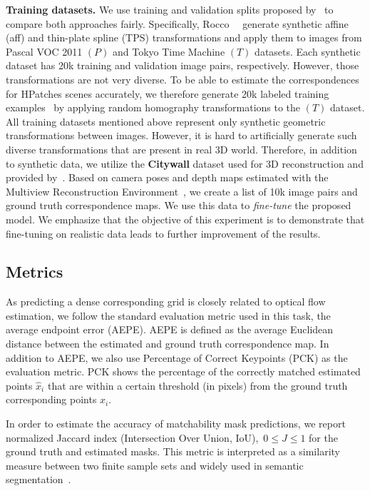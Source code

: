 \documentclass[10pt,twocolumn,letterpaper]{article}
\begin{document}
\noindent\textbf{Training datasets.} We use training and validation splits proposed by~\cite{Rocco17} to compare both approaches fairly. Specifically, Rocco~\etal ~\cite{Rocco17} generate synthetic affine (aff) and thin-plate spline (TPS) transformations and apply them to images from Pascal VOC 2011 $(P)$ and Tokyo Time Machine $(T)$ datasets. Each synthetic dataset has 20k training and validation image pairs, respectively. However, those transformations are not very diverse. 
To be able to estimate the correspondences for HPatches scenes accurately, we therefore generate 20k labeled training examples~\cite{DeepHomography} by applying random homography transformations to the $(T)$ dataset. All training datasets mentioned above represent only synthetic geometric transformations between images. However, it is hard to artificially generate such diverse transformations that are present in real 3D world. Therefore, in addition to synthetic data, we utilize the \textbf{Citywall} dataset used for 3D reconstruction and provided by~\cite{MVE}. Based on camera poses and depth maps estimated with the Multiview Reconstruction Environment~\cite{MVE}, we create a list of 10k image pairs and ground truth correspondence maps. We use this data to \textit{fine-tune} the proposed model. We emphasize that the objective of this experiment is to demonstrate that fine-tuning on realistic data leads to further improvement of the results.

\vspace{-1mm}
\subsection{Metrics}
As predicting a dense corresponding grid is closely related to optical flow estimation, we follow the standard evaluation metric used in this task, \ie the average endpoint error (AEPE). AEPE is  defined as the average Euclidean distance between the estimated and ground truth correspondence map. In addition to AEPE, we also use Percentage of Correct Keypoints (PCK) as the evaluation metric. PCK shows the percentage of the correctly matched estimated points $\hat{x}_i$ that are within a certain threshold (in pixels) from the ground truth corresponding points ${x}_i$.

In order to estimate the accuracy of matchability mask predictions, we report normalized Jaccard index (Intersection Over Union, IoU),~\ie $0 \leq J \leq 1$ for the ground truth and estimated masks. This metric is interpreted as a similarity measure between two finite sample sets and widely used in semantic segmentation~\cite{ods_segm}.
\end{document}
